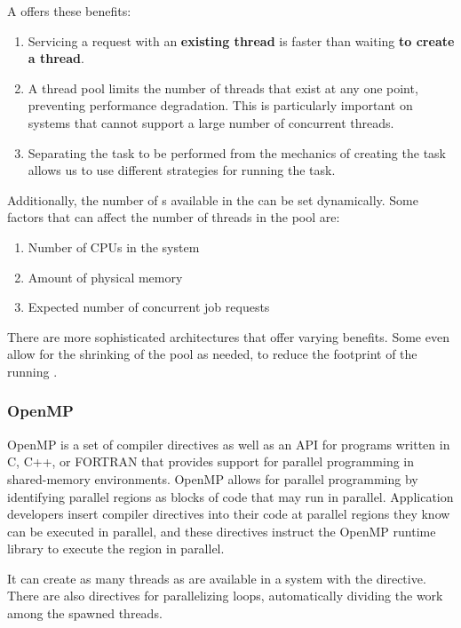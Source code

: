 A  offers these benefits:
\begin{enumerate}[noitemsep]
\item Servicing a request with an \textbf{existing thread} is faster than waiting \textbf{to create a thread}.
\item A thread pool limits the number of threads that exist at any one point, preventing performance degradation.
  This is particularly important on systems that cannot support a large number of concurrent threads.
\item Separating the task to be performed from the mechanics of creating the task allows us to use different strategies for running the task.
\end{enumerate}

Additionally, the number of s available in the  can be set dynamically.
Some factors that can affect the number of threads in the pool are:
\begin{enumerate}[noitemsep]
\item Number of CPUs in the system
\item Amount of physical memory
\item Expected number of concurrent job requests
\end{enumerate}

There are more sophisticated architectures that offer varying benefits.
Some even allow for the shrinking of the pool as needed, to reduce the footprint of the running .

\subsubsection{OpenMP}\label{subsubsec:OpenMP}
OpenMP is a set of compiler directives as well as an API for programs written in C, C++, or FORTRAN that provides support for parallel programming in shared-memory environments.
OpenMP allows for parallel programming by identifying parallel regions as blocks of code that may run in parallel.
Application developers insert compiler directives into their code at parallel regions they know can be executed in parallel, and these directives instruct the OpenMP runtime library to execute the region in parallel.

It can create as many threads as are available in a system with the  directive.
There are also directives for parallelizing loops, automatically dividing the work among the spawned threads.

